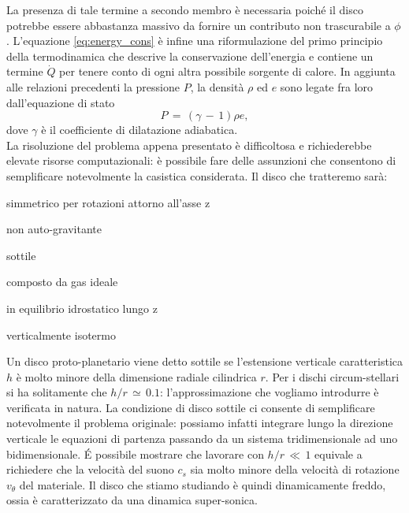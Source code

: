 La presenza di tale termine a secondo membro è necessaria poiché il disco potrebbe essere abbastanza massivo da fornire un contributo non trascurabile a $\phi$. L'equazione \eqref{eq:energy_cons} è infine una riformulazione del primo principio della termodinamica che descrive la conservazione dell'energia e contiene un termine $\dot{Q}$ per tenere conto di ogni altra possibile sorgente di calore.
In aggiunta alle relazioni precedenti la pressione $P$, la densità $\rho$ ed $e$ sono legate fra loro dall'equazione di stato
\begin{equation}
P\,=\,\left(\gamma\,-\,1\right)\rho e,
\label{eq:eq_state}
\end{equation}
dove $\gamma$ è il coefficiente di dilatazione adiabatica.\\

La risoluzione del problema appena presentato è difficoltosa e richiederebbe elevate risorse computazionali: è possibile fare delle assunzioni che consentono di semplificare notevolmente la casistica considerata. \newpage
Il disco che tratteremo sarà:
\begin{list}{\textbf{-}}{\setlength{\itemsep}{0cm}}
    \item simmetrico per rotazioni attorno all'asse z
    \item non auto-gravitante
    \item sottile
    \item composto da gas ideale
    \item in equilibrio idrostatico lungo z
    \item verticalmente isotermo
\end{list}
Un disco proto-planetario viene detto sottile se l'estensione verticale caratteristica $h$ è molto minore della dimensione radiale cilindrica $r$. 
Per i dischi circum-stellari si ha solitamente che $h/r\,\simeq\,0.1$:  l'approssimazione che vogliamo introdurre è verificata in natura.
La condizione di disco sottile ci consente di semplificare notevolmente il problema originale: possiamo infatti integrare lungo la direzione verticale le equazioni di partenza passando da un sistema tridimensionale ad uno bidimensionale. \'E possibile mostrare che lavorare con $h/r\,\ll\,1$ equivale a richiedere che la velocità del suono $c_s$ sia molto minore della velocità di rotazione $v_{\theta}$ del materiale. Il disco che stiamo studiando è quindi dinamicamente freddo, ossia è caratterizzato da una dinamica super-sonica.

